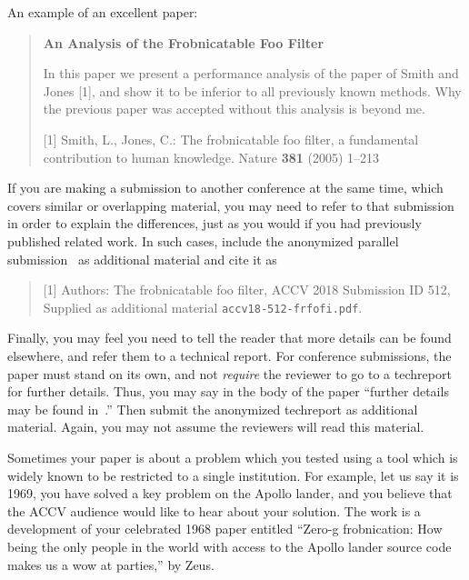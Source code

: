 \documentclass[runningheads]{llncs}
\begin{document}
An example of an excellent paper:   
   
\begin{quote}
\begin{center}
     {\bf An Analysis of the Frobnicatable Foo Filter}
\end{center}
   
   In this paper we present a performance analysis of the
   paper of Smith and Jones [1], and show it to be inferior to
   all previously known methods.  Why the previous paper
   was accepted without this analysis is beyond me.
   
   [1] Smith, L., Jones, C.: The frobnicatable foo
   filter, a fundamental contribution to human knowledge.
   Nature {\bf 381} (2005) 1--213
\end{quote}
   
If you are making a submission to another conference at the same time,
which covers similar or overlapping material, you may need to refer to that
submission in order to explain the differences, just as you would if you
had previously published related work.  In such cases, include the
anonymized parallel submission~\cite{Authors18} as additional material and
cite it as
\begin{quote}
[1]  Authors: The frobnicatable foo filter, ACCV 2018 Submission ID 512,
Supplied as additional material {\tt accv18-512-frfofi.pdf}.
\end{quote}

Finally, you may feel you need to tell the reader that more details can be found elsewhere, and refer them to a technical report.  For conference submissions, the paper must stand on its own, and not {\em require} the reviewer to go to a techreport for further details.  Thus, you may say in the body of the paper ``further details may be found in~\cite{Authors18b}.''  Then submit the anonymized techreport as additional material. Again, you may not assume the reviewers will read this material.

Sometimes your paper is about a problem which you tested using a tool which
is widely known to be restricted to a single institution.  For example,
let us say it is 1969, you have solved a key problem on the Apollo lander,
and you believe that the ACCV audience would like to hear about your
solution.  The work is a development of your celebrated 1968 paper entitled
``Zero-g frobnication: How being the only people in the world with access to
the Apollo lander source code makes us a wow at parties,'' by Zeus.
\end{document}

